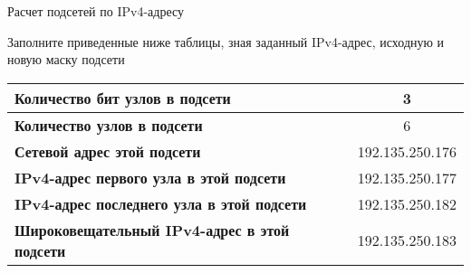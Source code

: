 \documentclass[a4paper,14pt]{extarticle}
\begin{document}
\begin{mypart}{Расчет подсетей по IPv4-адресу}
\begin{step}{Заполните приведенные ниже таблицы, зная заданный IPv4-адрес, исходную и
			новую маску подсети}
\begin{enumerate}
\begin{table}[h]
\begin{tabular}{|l|l|}
		\textbf{Количество бит узлов в подсети} & \multicolumn{1}{c|}{3} \\ \hline
		\textbf{Количество узлов в подсети} & \multicolumn{1}{c|}{6} \\ \hline
		\textbf{Сетевой адрес этой подсети} & 192.135.250.176 \\ \hline
		\textbf{IPv4-адрес первого узла в этой подсети} & 192.135.250.177 \\ \hline
		\textbf{IPv4-адрес последнего узла в этой подсети} & 192.135.250.182 \\ \hline
		\textbf{Широковещательный IPv4-адрес в этой подсети} & 192.135.250.183 \\ \hline
	\end{tabular}
	\label{}
	\end{table}

	\end{enumerate}
	\end{step}
\end{mypart}
\end{document}
